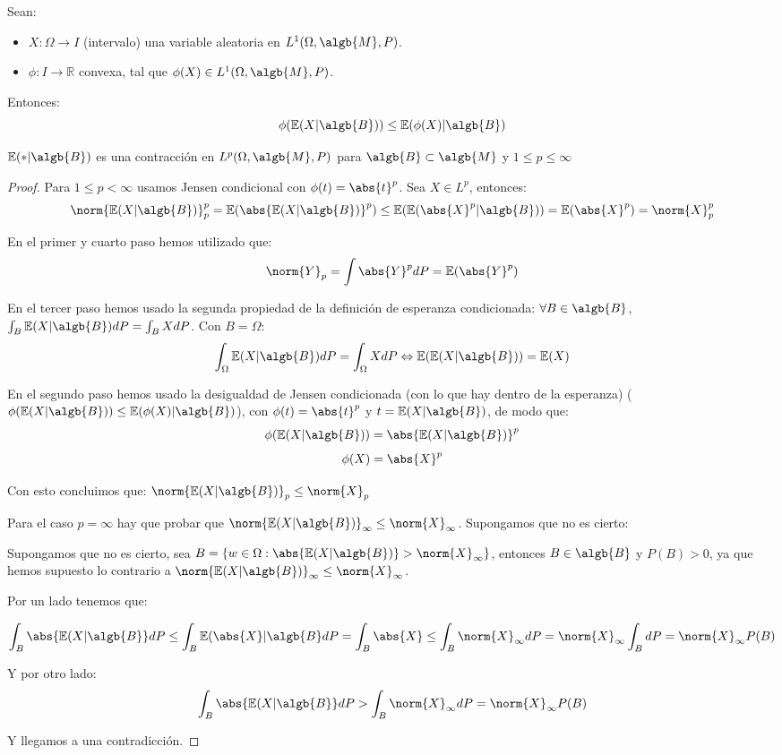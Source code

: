 \documentclass{apuntes}
\begin{document}
\begin{defn}
Sean:
\begin{itemize}
\item $X: \Omega \rightarrow I$ (intervalo) una variable aleatoria en $L^1(\Omega, \algb{M},P)$.
\item $\phi: I \rightarrow \mathbb{R}$ convexa, tal que $\phi(X) \in L^1(\Omega,\algb{M},P)$.
\end{itemize}
Entonces:
\[
\phi(\mathbb{E}(X|\algb{B})) \leq \mathbb{E}(\phi(X)|\algb{B})
\]
\end{defn}

\begin{theorem}
$\mathbb{E}(*|\algb{B})$ es una contracción en $L^p(\Omega, \algb{M}, P)$ para $\algb{B}\subset\algb{M}$ y $1\leq p\leq\infty$
\end{theorem}
\begin{proof}
Para $1\leq p < \infty$ usamos Jensen condicional con $\phi(t)=\abs{t}^p$. Sea $X \in L^p$, entonces:
\[
\norm{\mathbb{E}(X|\algb{B})}_p^p = \mathbb{E}(\abs{\mathbb{E}(X|\algb{B})}^p) \leq  \mathbb{E}(\mathbb{E}(\abs{X}^p|\algb{B})) = \mathbb{E}(\abs{X}^p) = \norm{X}_p^p
\]

En el primer y cuarto paso hemos utilizado que:
\[
\norm{Y}_p = \int \abs{Y}^pdP =\mathbb{E}(\abs{Y}^p)
\]

En el tercer paso hemos usado la segunda propiedad de la definición de esperanza condicionada: $\forall B \in \algb{B}$, $\int_{B}\mathbb{E}(X|\algb{B})dP=\int_{B}XdP$. Con $B=\Omega$:
\[
\int_{\Omega}\mathbb{E}(X|\algb{B})dP=\int_{\Omega}XdP \Leftrightarrow \mathbb{E}(\mathbb{E}(X|\algb{B}))=\mathbb{E}(X)
\]
 

En el segundo paso hemos usado la desigualdad de Jensen condicionada (con lo que hay dentro de la esperanza) ($\phi(\mathbb{E}(X|\algb{B})) \leq \mathbb{E}(\phi(X)|\algb{B})$), con $\phi(t)=\abs{t}^p$ y $t=\mathbb{E}(X|\algb{B})$, de modo que:
\[
\phi(\mathbb{E}(X|\algb{B})) = \abs{\mathbb{E}(X|\algb{B})}^p
\]
\[
\phi(X) = \abs{X}^p 
\]

Con esto concluimos que: $\norm{\mathbb{E}(X|\algb{B})}_p \leq \norm{X}_p$

Para el caso $p=\infty$ hay que probar que $\norm{\mathbb{E}(X|\algb{B})}_{\infty} \leq \norm{X}_{\infty}$. Supongamos que no es cierto:


Supongamos que no es cierto, sea $B=\{w \in \Omega: \abs{\mathbb{E}(X|\algb{B})}>\norm{X}_{\infty}\}$, entonces $B \in \algb{B}$ y $P(B) > 0$, ya que hemos supuesto lo contrario a $\norm{\mathbb{E}(X|\algb{B})}_{\infty} \leq \norm{X}_{\infty}$.

Por un lado tenemos que:

\[
\int_B \abs{\mathbb{E}(X|\algb{B}} dP \leq \int_B \mathbb{E}(\abs{X}|\algb{B} dP = \int_B \abs{X} \leq \int_B \norm{X}_{\infty} dP = \norm{X}_{\infty}\int_BdP=\norm{X}_{\infty}P(B)
\]

Y por otro lado:
\[
\int_B \abs{\mathbb{E}(X|\algb{B}} dP > \int_B \norm{X}_{\infty}dP = \norm{X}_{\infty}P(B)
\]

Y llegamos a una contradicción.
\end{proof}
\end{document}
